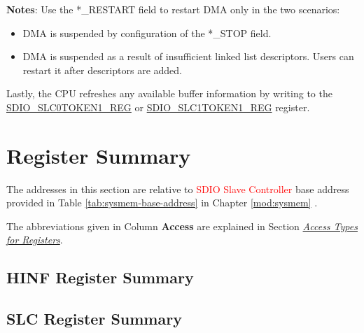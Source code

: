 \documentclass[main\_\_EN.tex]{subfiles}
\begin{document}
\textbf{Notes}: Use the *\_RESTART field to restart DMA only in the two scenarios: 
\begin{itemize}
    \item DMA is suspended by configuration of the *\_STOP field.
    \item DMA is suspended as a result of insufficient linked list descriptors. Users can restart it after descriptors are added. 
\end{itemize}

Lastly, the CPU refreshes any available buffer information 
by writing to the \hyperref[regdesc:SDIOSLC0TOKEN1REG]{SDIO\_SLC0TOKEN1\_REG} or \hyperref[regdesc:SDIOSLC1TOKEN1REG]{SDIO\_SLC1TOKEN1\_REG} register.





\clearpage
\hypertarget{sdioslave-reg-summ}{}
\section{Register Summary}
\label{sec:sdioslave-reg-summ}

The addresses in this section are relative to \textcolor{red}{SDIO Slave Controller} base address provided in Table \ref{tab:sysmem-base-address} in Chapter \ref{mod:sysmem} \textit{}.

The abbreviations given in Column \textbf{Access} are explained in Section \hyperref[glossary-access-types]{\textit{Access Types for Registers}}.

\subsection{HINF Register Summary}
\label{sec:sdioslave-hinf-reg-summ}



\subsection{SLC Register Summary}
\label{sec:sdioslave-slc-reg-summ}


\end{document}
